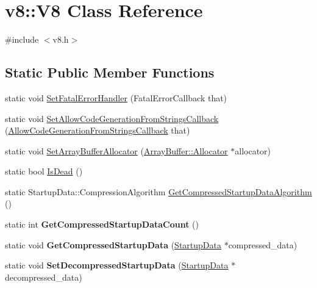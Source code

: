 \hypertarget{classv8_1_1_v8}{}\section{v8\+:\+:V8 Class Reference}
\label{classv8_1_1_v8}


{\ttfamily \#include $<$v8.\+h$>$}

\subsection*{Static Public Member Functions}
\begin{DoxyCompactItemize}
\item 
static void \hyperlink{classv8_1_1_v8_ab386f81a6d58dcf481d00446e8d15c9e}{Set\+Fatal\+Error\+Handler} (Fatal\+Error\+Callback that)
\item 
static void \hyperlink{classv8_1_1_v8_ad4abec314050af6e68df3a339634293e}{Set\+Allow\+Code\+Generation\+From\+Strings\+Callback} (\hyperlink{namespacev8_a521d909ec201742a1cb35d50a8e2a3c2}{Allow\+Code\+Generation\+From\+Strings\+Callback} that)
\item 
static void \hyperlink{classv8_1_1_v8_abc40950a39f8cb6946dc8a1ad41eea84}{Set\+Array\+Buffer\+Allocator} (\hyperlink{classv8_1_1_array_buffer_1_1_allocator}{Array\+Buffer\+::\+Allocator} $\ast$allocator)
\item 
static bool \hyperlink{classv8_1_1_v8_a0d5593ecf0d41035e4d9ee512119f0b7}{Is\+Dead} ()
\item 
static Startup\+Data\+::\+Compression\+Algorithm \hyperlink{classv8_1_1_v8_a6d1b72d0cecdc64d0a0b8e784025b625}{Get\+Compressed\+Startup\+Data\+Algorithm} ()
\item 
\hypertarget{classv8_1_1_v8_ab598cfc79ebbc85fdeb2171b84ce53e6}{}static int {\bfseries Get\+Compressed\+Startup\+Data\+Count} ()\label{classv8_1_1_v8_ab598cfc79ebbc85fdeb2171b84ce53e6}

\item 
\hypertarget{classv8_1_1_v8_a736d6ddfdbbd72ca5838f931002334df}{}static void {\bfseries Get\+Compressed\+Startup\+Data} (\hyperlink{classv8_1_1_startup_data}{Startup\+Data} $\ast$compressed\+\_\+data)\label{classv8_1_1_v8_a736d6ddfdbbd72ca5838f931002334df}

\item 
\hypertarget{classv8_1_1_v8_a46d5618689f239b70425b8d7917cebf5}{}static void {\bfseries Set\+Decompressed\+Startup\+Data} (\hyperlink{classv8_1_1_startup_data}{Startup\+Data} $\ast$decompressed\+\_\+data)\label{classv8_1_1_v8_a46d5618689f239b70425b8d7917cebf5}


\end{DoxyCompactItemize}
